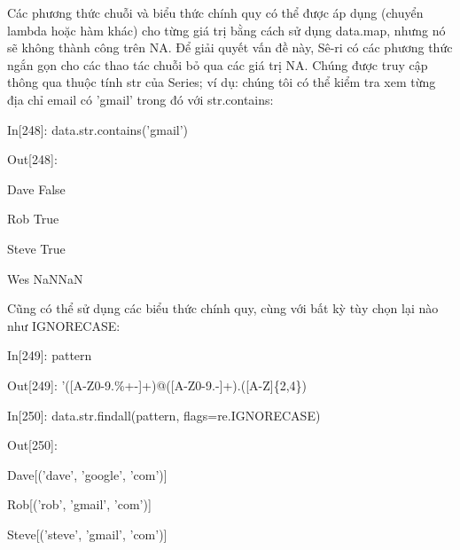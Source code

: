 Các phương thức chuỗi và biểu thức chính quy có thể được áp dụng (chuyển lambda hoặc hàm khác) cho từng giá trị bằng cách sử dụng data.map, nhưng nó sẽ không thành công trên NA. Để giải quyết vấn đề này, Sê-ri có các phương thức ngắn gọn cho các thao tác chuỗi bỏ qua các giá trị NA. Chúng được truy cập thông qua thuộc tính str của Series; ví dụ: chúng tôi có thể kiểm tra xem từng địa chỉ email có 'gmail' trong đó với str.contains:\par
\hspace{1cm}In\hspace{3mm}[248]:\hspace{3mm} data.str.contains('gmail')\par
\hspace{1cm}Out[248]:\hspace{3mm}\par
\hspace{1cm}Dave False\par
\hspace{1cm}Rob True\par
\hspace{1cm}Steve True\par
\hspace{1cm}Wes NaNNaN \par
Cũng có thể sử dụng các biểu thức chính quy, cùng với bất k\hspace{3mm}ỳ tùy chọn lại nào như IGNORECASE:\par
\hspace{1cm}In\hspace{3mm}[249]:\hspace{3mm} pattern\par
\hspace{1cm}Out[249]:\hspace{3mm} '([A-Z0-9.\%+-]+)@([A-Z0-9.-]+).([A-Z]\{2,4\}) \par
\hspace{1cm}In\hspace{3mm}[250]:\hspace{3mm} data.str.findall(pattern, flags=re.IGNORECASE)\par
\hspace{1cm}Out[250]:\par
\hspace{1cm}Dave[('dave', 'google', 'com')]\par
\hspace{1cm}Rob[('rob', 'gmail', 'com')]\par
\hspace{1cm}Steve[('steve', 'gmail', 'com')]\par
